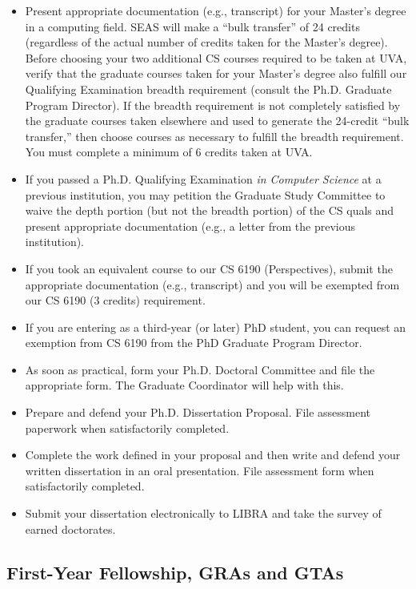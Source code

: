 \begin{itemize}[nosep]
\item
  Present appropriate documentation (e.g., transcript) for your Master's
  degree in a computing field. SEAS will make a ``bulk transfer'' of 24
  credits (regardless of the actual number of credits taken for the
  Master's degree). Before choosing your two additional CS courses
  required to be taken at UVA, verify that the graduate courses taken
  for your Master's degree also fulfill our Qualifying Examination
  breadth requirement (consult the Ph.D. Graduate Program Director). If
  the breadth requirement is not completely satisfied by the graduate
  courses taken elsewhere and used to generate the 24-credit ``bulk
  transfer,'' then choose courses as necessary to fulfill the breadth
  requirement. You must complete a minimum of 6 credits taken at UVA.
\item
  If you passed a Ph.D. Qualifying Examination \emph{in Computer Science}
  at a previous institution, you may petition the Graduate Study
  Committee to waive the depth portion (but not the breadth portion) of
  the CS quals and present appropriate documentation (e.g., a letter
  from the previous institution).
\item
  If you took an equivalent course to our CS 6190 (Perspectives), submit the
  appropriate documentation (e.g., transcript) and you will be exempted
  from our CS 6190 (3 credits) requirement.
\item
  If you are entering as a third-year (or later) PhD student, you can
  request an exemption from CS 6190 from the PhD Graduate Program
  Director.
\item
  As soon as practical, form your Ph.D. Doctoral Committee
  and file the appropriate form. The Graduate Coordinator will help with this.
\item
  Prepare and defend your Ph.D. Dissertation Proposal. File assessment
  paperwork when satisfactorily completed.
\item
  Complete the work defined in your proposal and then write and defend
  your written dissertation in an oral presentation. File assessment
  form when satisfactorily completed.
\item
  Submit your dissertation electronically to LIBRA and take the survey of earned doctorates.
\end{itemize}

\hypertarget{first-year-fellowship-gras-and-gtas}{
\subsection{First-Year Fellowship, GRAs and GTAs}
\label{first-year-fellowship-gras-and-gtas}
}

